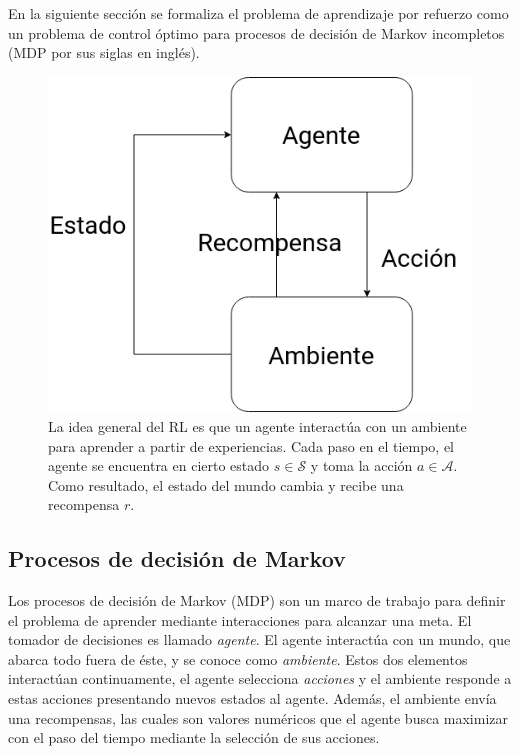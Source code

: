 En la siguiente sección se formaliza el problema de aprendizaje por refuerzo como
un problema de control óptimo para procesos de decisión de Markov incompletos (MDP por sus siglas en inglés).

\begin{figure}
    \centering
    \includegraphics[scale=0.25]{Chapter2/Figs/agend_interaction.png}
    \caption{La idea general del RL es que un agente interactúa con un ambiente para
    aprender a partir de experiencias. Cada paso en el tiempo, el agente se encuentra
    en cierto estado $s\in \mathcal{S}$ y toma la acción $a \in \mathcal{A}$. Como
    resultado, el estado del mundo cambia y recibe una recompensa $r$.}
\end{figure}

\subsection{Procesos de decisión de Markov}


Los procesos de decisión de Markov (MDP) son un marco de trabajo para
definir el problema de aprender
mediante interacciones para 
alcanzar una meta. El tomador de 
decisiones es llamado \textit{agente}.
El agente interactúa con un mundo, que
abarca todo fuera de éste, y se
conoce como \textit{ambiente}.
Estos dos elementos
interactúan continuamente, el agente
selecciona \textit{acciones} y
el ambiente responde a estas 
acciones presentando nuevos 
estados al agente. Además,
el ambiente envía una recompensas,
las cuales son valores numéricos 
que el agente busca maximizar con
el paso del tiempo mediante la 
selección de sus acciones.

